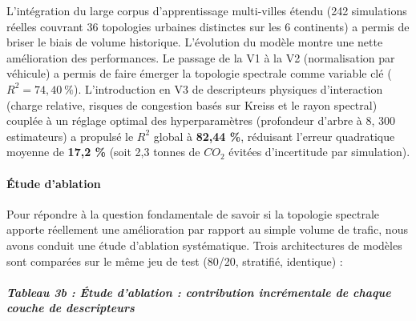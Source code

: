 \documentclass[10pt, a4paper]{article}
\begin{document}
L'intégration du large corpus d'apprentissage multi-villes étendu (242
simulations réelles couvrant 36 topologies urbaines distinctes sur les 6
continents) a permis de briser le biais de volume historique.
L'évolution du modèle montre une nette amélioration des performances. Le
passage de la V1 à la V2 (normalisation par véhicule) a permis de faire
émerger la topologie spectrale comme variable clé
(\(R^2 = 74{,}40\ \%\)). L'introduction en V3 de descripteurs physiques
d'interaction (charge relative, risques de congestion basés sur Kreiss
et le rayon spectral) couplée à un réglage optimal des hyperparamètres
(profondeur d'arbre à 8, 300 estimateurs) a propulsé le \(R^2\) global à
\textbf{82,44 \%}, réduisant l'erreur quadratique moyenne de
\textbf{17,2 \%} (soit 2,3 tonnes de \(CO_2\) évitées d'incertitude par
simulation).

\paragraph{Étude d'ablation}\label{uxe9tude-dablation}

Pour répondre à la question fondamentale de savoir si la topologie
spectrale apporte réellement une amélioration par rapport au simple
volume de trafic, nous avons conduit une étude d'ablation systématique.
Trois architectures de modèles sont comparées sur le même jeu de test
(80/20, stratifié, identique) :

\subparagraph{Tableau 3b : Étude d'ablation : contribution incrémentale
de chaque couche de
descripteurs}\label{tableau-3b-uxe9tude-dablation-contribution-incruxe9mentale-de-chaque-couche-de-descripteurs}
\end{document}
